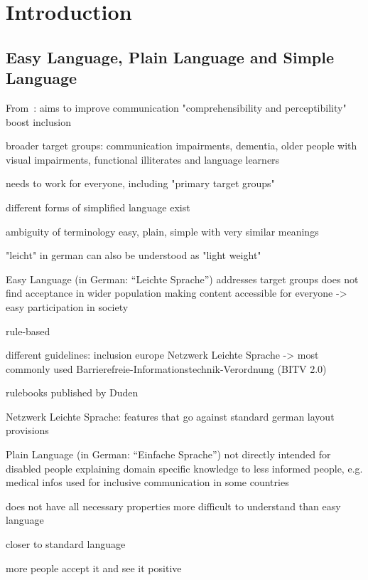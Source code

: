 \chapter{Introduction}\label{ch:introduction}


\section{Easy Language, Plain Language and Simple Language}\label{sec:el}


From~\autocite{easyLanguageBook}:
aims to improve communication
"comprehensibility and perceptibility"
boost inclusion

broader target groups: communication impairments, dementia, older people with visual impairments,
functional illiterates and language learners

needs to work for everyone, including "primary target groups"


different forms of simplified language exist

ambiguity of terminology
easy, plain, simple with very similar meanings

"leicht" in german can also be understood as "light weight"

Easy Language (in German: “Leichte Sprache”)
addresses target groups
does not find acceptance in wider population
making content accessible for everyone -> easy participation in society

rule-based

different guidelines:
    inclusion europe
    Netzwerk Leichte Sprache -> most commonly used
    Barrierefreie-Informationstechnik-Verordnung (BITV 2.0)

rulebooks published by Duden

Netzwerk Leichte Sprache:
    features that go against standard german
    layout provisions




Plain Language (in German: “Einfache Sprache”)
not directly intended for disabled people
explaining domain specific knowledge to less informed people, e.g. medical infos
used for inclusive communication in some countries

does not have all necessary properties
more difficult to understand than easy language

closer to standard language

more people accept it and see it positive


